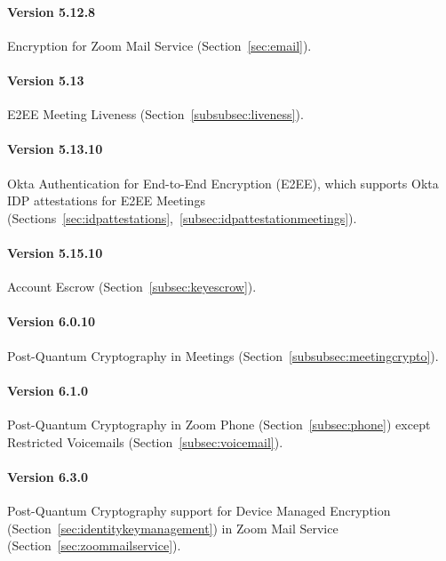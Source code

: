 \paragraph{Version 5.12.8}
Encryption for Zoom Mail Service (Section~\ref{sec:email}).

\paragraph{Version 5.13}
E2EE Meeting Liveness (Section~\ref{subsubsec:liveness}).

\paragraph{Version 5.13.10}
Okta Authentication for End-to-End Encryption (E2EE), which supports Okta IDP attestations for E2EE
Meetings (Sections~\ref{sec:idpattestations},~\ref{subsec:idpattestationmeetings}).

\paragraph{Version 5.15.10}
Account Escrow (Section~\ref{subsec:keyescrow}).

\paragraph{Version 6.0.10}
Post-Quantum Cryptography in Meetings (Section~\ref{subsubsec:meetingcrypto}).

\paragraph{Version 6.1.0}
Post-Quantum Cryptography in Zoom Phone (Section~\ref{subsec:phone}) except Restricted Voicemails
(Section~\ref{subsec:voicemail}).

\paragraph{Version 6.3.0}
Post-Quantum Cryptography support for Device Managed Encryption
(Section~\ref{sec:identitykeymanagement}) in Zoom Mail Service (Section~\ref{sec:zoommailservice}).

